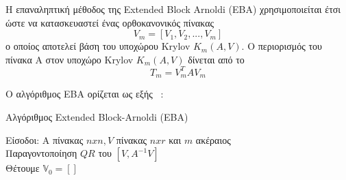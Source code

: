 Η επαναληπτική μέθοδος της \textlatin{Extended Block Arnoldi (EBA)} χρησιμοποιείται έτσι ώστε να κατασκευαστεί ένας ορθοκανονικός πίνακας
\textlatin{
\[ V_m = [V_1, V_2, ..., V_m]\]
} ο οποίος αποτελεί βάση του υποχώρου \textlatin{Krylov $K_m(A, V)$}. Ο περιορισμός του πίνακα Α στον υποχώρο \textlatin{Krylov $K_m(A, V)$} δίνεται από το
\[ Τ_m = V_{m}^{T}AV_m\]

Ο αλγόριθμος EBA ορίζεται ως εξής ~\cite{bentbib2017some, bentbib2015some, druskin1998extended, heyouni2010extended, simoncini2007new}:

\begin{algorithm}[H]
    \SetAlgoLined
    \caption{ Αλγόριθμος  Extended Block-Arnoldi (EBA)}
    Είσοδοι: A πίνακας $n x n, V$ πίνακας $n x r$ και $m$ ακέραιος\\
    Παραγοντοποίηση $QR$ του $[V, A^{-1}V]$\\
    Θέτουμε $\mathbb{V}_0 = []$\\
\end{algorithm}
